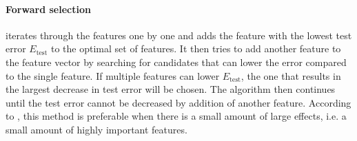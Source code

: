 \paragraph{Forward selection} iterates through the features one by one and adds the feature with the lowest test error $E_{\mathrm{test}}$ to the optimal set of features. It then tries to add another feature to the feature vector by searching for candidates that can lower the error compared to the single feature. If multiple features can lower $E_{\mathrm{test}}$, the one that results in the largest decrease in test error will be chosen. The algorithm then continues until the test error cannot be decreased by addition of another feature. According to \citep{Tibshirani94regressionshrinkage}, this method is preferable when there is a small amount of large effects, i.e. a small amount of highly important features.

